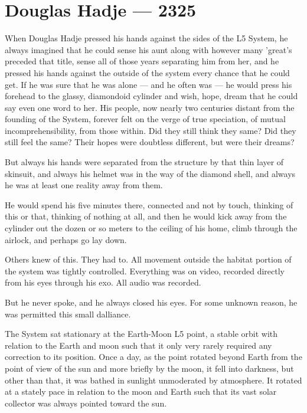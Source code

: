 \hypertarget{douglas-hadje-2325}{%
\chapter{Douglas Hadje — 2325}\label{douglas-hadje-2325}}

When Douglas Hadje pressed his hands against the sides of the L5 System, he always imagined that he could sense his aunt along with however many 'great's preceded that title, sense all of those years separating him from her, and he pressed his hands against the outside of the system every chance that he could get. If he was sure that he was alone — and he often was — he would press his forehead to the glassy, diamondoid cylinder and wish, hope, dream that he could say even one word to her. His people, now nearly two centuries distant from the founding of the System, forever felt on the verge of true speciation, of mutual incomprehensibility, from those within. Did they still think they same? Did they still feel the same? Their hopes were doubtless different, but were their dreams?

But always his hands were separated from the structure by that thin layer of skinsuit, and always his helmet was in the way of the diamond shell, and always he was at least one reality away from them.

He would spend his five minutes there, connected and not by touch, thinking of this or that, thinking of nothing at all, and then he would kick away from the cylinder out the dozen or so meters to the ceiling of his home, climb through the airlock, and perhaps go lay down.

Others knew of this. They had to. All movement outside the habitat portion of the system was tightly controlled. Everything was on video, recorded directly from his eyes through his exo. All audio was recorded.

But he never spoke, and he always closed his eyes. For some unknown reason, he was permitted this small dalliance.

The System sat stationary at the Earth-Moon L5 point, a stable orbit with relation to the Earth and moon such that it only very rarely required any correction to its position. Once a day, as the point rotated beyond Earth from the point of view of the sun and more briefly by the moon, it fell into darkness, but other than that, it was bathed in sunlight unmoderated by atmosphere. It rotated at a stately pace in relation to the moon and Earth such that its vast solar collector was always pointed toward the sun.

